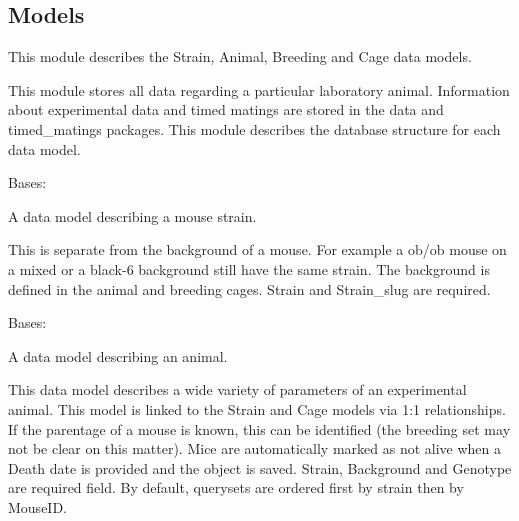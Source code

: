 \documentclass[letterpaper,10pt,english]{sphinxmanual}
\begin{document}
\subsection{Models}
\label{api:id1}\label{api:module-animal.models}
This module describes the Strain, Animal, Breeding and Cage data models.

This module stores all data regarding a particular laboratory animal.  Information about experimental data and timed matings are stored in the data and timed\_matings packages.  This module describes the database structure for each data model.

\begin{fulllineitems}
\label{api:animal.models.Strain}
Bases: 

A data model describing a mouse strain.

This is separate from the background of a mouse.  For example a ob/ob mouse on a mixed or a black-6 background still have the same strain.  The background is defined in the animal and breeding cages.  Strain and Strain\_slug are required.

\end{fulllineitems}


\begin{fulllineitems}
\label{api:animal.models.Animal}
Bases: 

A data model describing an animal.

This data model describes a wide variety of parameters of an experimental animal.  This model is linked to the Strain and Cage models via 1:1 relationships.  If the parentage of a mouse is known, this can be identified (the breeding set may not be clear on this matter). Mice are automatically marked as not alive when a Death date is provided and the object is saved.  Strain, Background and Genotype are required field.  By default, querysets are ordered first by strain then by MouseID.

\end{fulllineitems}

\end{document}
